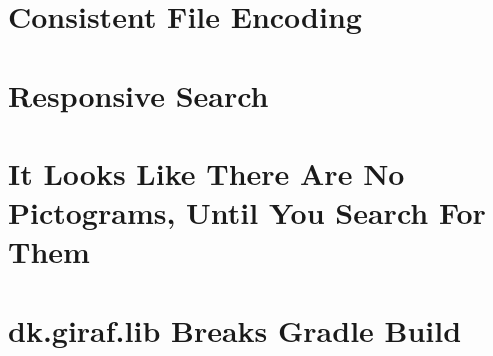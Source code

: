 
\section{Consistent File Encoding}
\section{Responsive Search}

\section{It Looks Like There Are No Pictograms, Until You Search For Them}

\section{dk.giraf.lib Breaks Gradle Build}
